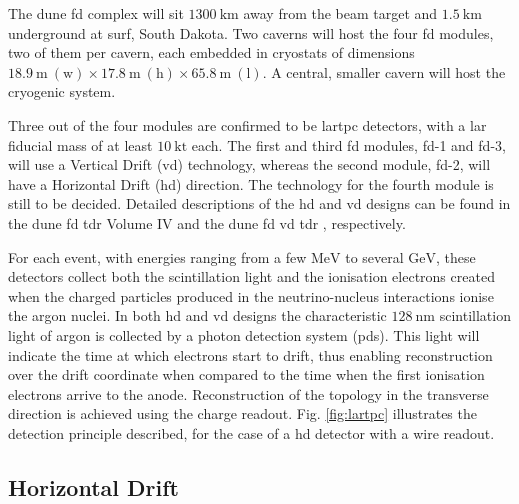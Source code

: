 The \gls{dune} \gls{fd} complex will sit $1300~\mathrm{km}$ away from the beam target and $1.5~\mathrm{km}$ underground at \gls{surf}, South Dakota. Two caverns will host the four \gls{fd} modules, two of them per cavern, each embedded in cryostats of dimensions $18.9~\mathrm{m} ~ (\text{w}) \times 17.8~\mathrm{m} ~ (\text{h}) \times 65.8~\mathrm{m} ~ (\text{l})$. A central, smaller cavern will host the cryogenic system.

Three out of the four modules are confirmed to be \gls{lartpc} detectors, with a \gls{lar} fiducial mass of at least $10 ~ \mathrm{kt}$ each. The first and third \gls{fd} modules, \gls{fd}-1 and \gls{fd}-3, will use a Vertical Drift (\gls{vd}) technology, whereas the second module, \gls{fd}-2, will have a Horizontal Drift (\gls{hd}) direction. The technology for the fourth module is still to be decided. Detailed descriptions of the \gls{hd} and \gls{vd} designs can be found in the \gls{dune} \gls{fd} \gls{tdr} Volume IV \cite{DUNE2020TDR4} and the \gls{dune} \gls{fd} \gls{vd} \gls{tdr} \cite{DUNEVDTDR}, respectively.

For each event, with energies ranging from a few $\mathrm{MeV}$ to several $\mathrm{GeV}$, these detectors collect both the scintillation light and the ionisation electrons created when the charged particles produced in the neutrino-nucleus interactions ionise the argon nuclei. In both \gls{hd} and \gls{vd} designs the characteristic $128~\mathrm{nm}$ scintillation light of argon is collected by a photon detection system (\gls{pds}). This light will indicate the time at which electrons start to drift, thus enabling reconstruction over the drift coordinate when compared to the time when the first ionisation electrons arrive to the anode. Reconstruction of the topology in the transverse direction is achieved using the charge readout. Fig. \ref{fig:lartpc} illustrates the detection principle described, for the case of a \gls{hd} detector with a wire readout.

\subsection{Horizontal Drift}

